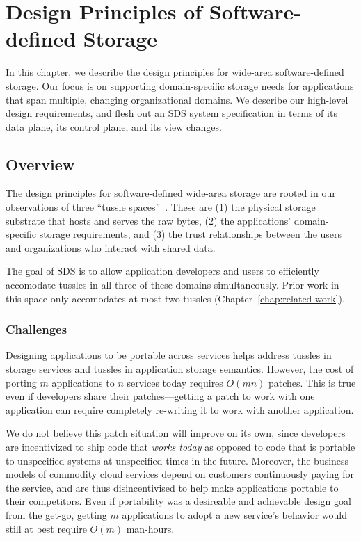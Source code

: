\chapter{Design Principles of Software-defined Storage}
\label{chap:design_principles}

In this chapter, we describe the design principles for wide-area
software-defined storage.  Our focus is on supporting domain-specific storage
needs for applications that span multiple, changing
organizational domains.  We describe our high-level design requirements,
and flesh out an SDS system specification in terms of its data plane, its
control plane, and its view changes.

\section{Overview}

The design principles for software-defined wide-area storage are rooted in 
our observations of three ``tussle spaces''~\cite{david-clark-tussle-spaces}.
These are (1) the physical storage substrate that hosts and serves the raw
bytes, (2) the applications' domain-specific storage requirements, and (3) the trust
relationships between the users and organizations who interact with shared
data.

The goal of SDS is to allow application developers and users to efficiently accomodate tussles
in all three of these domains simultaneously.  Prior work in this space
only accomodates at most two tussles (Chapter~\ref{chap:related-work}).

\subsection{Challenges}

Designing applications to be portable across services helps address tussles in
storage services and tussles in application storage semantics.
However, the cost of porting $m$ applications to $n$ services
today requires $O(mn)$ patches.  This is true even if developers share their
patches---getting a patch to work with one application can require completely
re-writing it to work with another application.

We do not believe this patch situation will improve on its own,
since developers are incentivized to ship code that \emph{works
today} as opposed to code that is portable to unspecified systems at unspecified
times in the future.  Moreover, the business models of commodity cloud services
depend on customers continuously paying for the service, and are thus
disincentivised to help make applications portable to their competitors.
Even if portability was a desireable and achievable design goal from the get-go,
getting $m$ applications to adopt a new service's behavior would still at best
require $O(m)$ man-hours.

